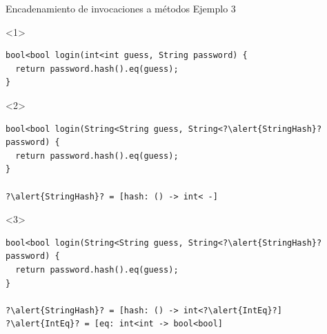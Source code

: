 \documentclass[aspectratio=169,10pt]{beamer}
\begin{document}
\begin{frame}[fragile]{Encadenamiento de invocaciones a métodos}
	Ejemplo 3 \\
	\vspace{1cm}
	\begin{onlyenv}
\begin{lstlisting}[escapechar=?,basicstyle=\fontsize{9}{9}\ttfamily]
bool<bool login(int<int guess, String password) {
  return password.hash().eq(guess);
}
\end{lstlisting}
	\end{onlyenv}
	\begin{onlyenv}
\begin{lstlisting}[escapechar=?,basicstyle=\fontsize{9}{9}\ttfamily]
bool<bool login(String<String guess, String<?\alert{StringHash}? password) {
  return password.hash().eq(guess);
}

?\alert{StringHash}? = [hash: () -> int< -]
\end{lstlisting}
	\end{onlyenv}
	\begin{onlyenv}
\begin{lstlisting}[escapechar=?,basicstyle=\fontsize{9}{9}\ttfamily]
bool<bool login(String<String guess, String<?\alert{StringHash}? password) {
  return password.hash().eq(guess);
}

?\alert{StringHash}? = [hash: () -> int<?\alert{IntEq}?]
?\alert{IntEq}? = [eq: int<int -> bool<bool]
\end{lstlisting}
	\end{onlyenv}
\end{frame}
\end{document}

